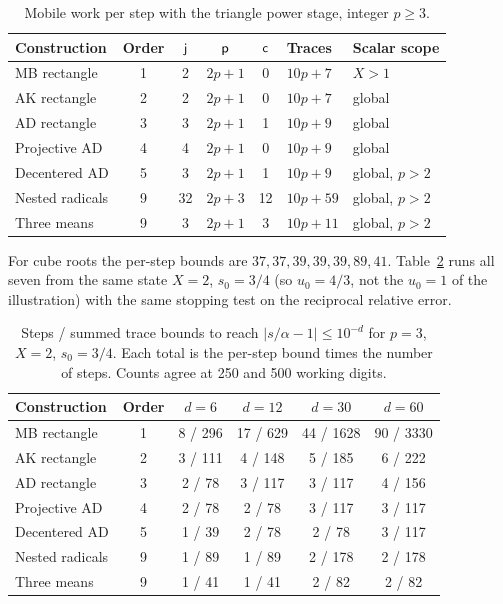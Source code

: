 \begin{table}[h]
\centering\small
\caption{Mobile work per step with the triangle power stage, integer $p\ge3$.}\label{tab:mobile}
\begin{tabular}{@{}lccccll@{}}
\toprule
Construction & Order & $\mathsf{j}$ & $\mathsf{p}$ & $\mathsf{c}$ & Traces & Scalar scope\\
\midrule
MB rectangle & 1 & 2 & $2p+1$ & 0 & $10p+7$ & $X>1$\\
AK rectangle & 2 & 2 & $2p+1$ & 0 & $10p+7$ & global\\
AD rectangle & 3 & 3 & $2p+1$ & 1 & $10p+9$ & global\\
Projective AD & 4 & 4 & $2p+1$ & 0 & $10p+9$ & global\\
Decentered AD & 5 & 3 & $2p+1$ & 1 & $10p+9$ & global, $p>2$\\
Nested radicals & 9 & 32 & $2p+3$ & 12 & $10p+59$ & global, $p>2$\\
Three means & 9 & 3 & $2p+1$ & 3 & $10p+11$ & global, $p>2$\\
\bottomrule
\end{tabular}
\end{table}

For cube roots the per-step bounds are $37,37,39,39,39,89,41$. Table~\ref{tab:cubic} runs all seven from the
same state $X=2$, $s_0=3/4$ (so $u_0=4/3$, not the $u_0=1$ of the illustration) with the same stopping
test on the reciprocal relative error.

\begin{table}[h]
\centering\small
\caption{Steps / summed trace bounds to reach $|s/\alpha-1|\le10^{-d}$ for $p=3$, $X=2$, $s_0=3/4$.
Each total is the per-step bound times the number of steps. Counts agree at 250 and 500 working
digits.}\label{tab:cubic}
\begin{tabular}{@{}lccccc@{}}
\toprule
Construction & Order & $d=6$ & $d=12$ & $d=30$ & $d=60$\\
\midrule
MB rectangle & 1 & 8 / 296 & 17 / 629 & 44 / 1628 & 90 / 3330\\
AK rectangle & 2 & 3 / 111 & 4 / 148 & 5 / 185 & 6 / 222\\
AD rectangle & 3 & 2 / 78 & 3 / 117 & 3 / 117 & 4 / 156\\
Projective AD & 4 & 2 / 78 & 2 / 78 & 3 / 117 & 3 / 117\\
Decentered AD & 5 & 1 / 39 & 2 / 78 & 2 / 78 & 3 / 117\\
Nested radicals & 9 & 1 / 89 & 1 / 89 & 2 / 178 & 2 / 178\\
Three means & 9 & 1 / 41 & 1 / 41 & 2 / 82 & 2 / 82\\
\bottomrule
\end{tabular}
\end{table}

